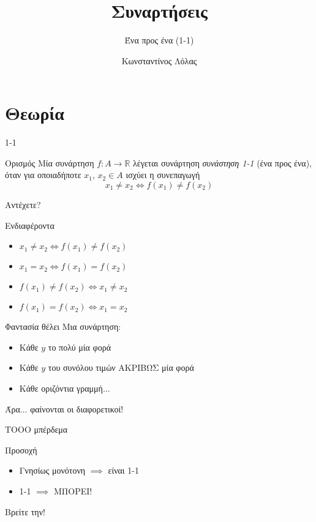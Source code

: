 \documentclass[greek]{beamer}
\title{Συναρτήσεις}
\subtitle{Ένα προς ένα (1-1)}
\author[Λόλας]{Κωνσταντίνος Λόλας }
\institute[$10^ο$ ΓΕΛ]{$10^ο$ ΓΕΛ Θεσσαλονίκης}
\date{}
\begin{document}
\begin{frame}
  \titlepage
\end{frame}

\section{Θεωρία}
\begin{frame}{1-1}
  \begin{block}{Ορισμός}
    Μία συνάρτηση $f:Α\to\mathbb{R}$ λέγεται συνάρτηση \emph{συνάστηση 1-1} (ένα προς ένα), όταν για οποιαδήποτε $x_1$, $x_2\in Α$ ισχύει η συνεπαγωγή
    $$x_1\ne x_2 \iff f(x_1)\ne f(x_2)$$
  \end{block}
\end{frame}

\begin{frame}{Αντέχετε?}
  \begin{exampleblock}{Ενδιαφέροντα}
    \begin{itemize}
      \item $x_1\ne x_2 \iff f(x_1)\ne f(x_2)$
      \item $x_1= x_2 \iff f(x_1)= f(x_2)$
      \item $f(x_1)\ne f(x_2) \iff x_1\ne x_2$
      \item $f(x_1)= f(x_2) \iff x_1= x_2$
    \end{itemize}
  \end{exampleblock}
\end{frame}

\begin{frame}{Φαντασία θέλει}
  Μια συνάρτηση:
  \begin{itemize}
    \item Κάθε $y$ το πολύ μία φορά \pause
    \item Κάθε $y$ του συνόλου τιμών ΑΚΡΙΒΩΣ μία φορά \pause
    \item Κάθε οριζόντια γραμμή...
  \end{itemize}
  Άρα... φαίνονται οι διαφορετικοί!
\end{frame}

\begin{frame}{ΤΟΟΟ μπέρδεμα}
  \begin{alertblock}{Προσοχή}
    \begin{itemize}
      \item Γνησίως μονότονη $\implies$ \pause είναι 1-1 \pause
      \item  1-1 $\implies$ \pause ΜΠΟΡΕΙ!
    \end{itemize}
  \end{alertblock}
  Βρείτε την!
\end{frame}
\end{document}
